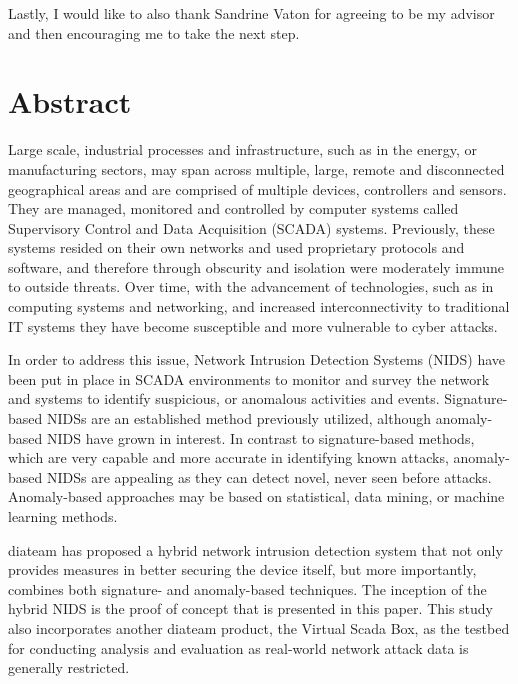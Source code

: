 \documentclass[11pt,]{article}
\begin{document}
Lastly, I would like to also thank Sandrine Vaton for agreeing to be my
advisor and then encouraging me to take the next step.

\newpage
\mbox{} \thispagestyle{empty}

\clearpage

\section*{Abstract}\label{abstract}

Large scale, industrial processes and infrastructure, such as in the
energy, or manufacturing sectors, may span across multiple, large,
remote and disconnected geographical areas and are comprised of multiple
devices, controllers and sensors. They are managed, monitored and
controlled by computer systems called Supervisory Control and Data
Acquisition (SCADA) systems. Previously, these systems resided on their
own networks and used proprietary protocols and software, and therefore
through obscurity and isolation were moderately immune to outside
threats. Over time, with the advancement of technologies, such as in
computing systems and networking, and increased interconnectivity to
traditional IT systems they have become susceptible and more vulnerable
to cyber attacks.

In order to address this issue, Network Intrusion Detection Systems
(NIDS) have been put in place in SCADA environments to monitor and
survey the network and systems to identify suspicious, or anomalous
activities and events. Signature-based NIDSs are an established method
previously utilized, although anomaly-based NIDS have grown in interest.
In contrast to signature-based methods, which are very capable and more
accurate in identifying known attacks, anomaly-based NIDSs are appealing
as they can detect novel, never seen before attacks. Anomaly-based
approaches may be based on statistical, data mining, or machine learning
methods.

diateam has proposed a hybrid network intrusion detection system that
not only provides measures in better securing the device itself, but
more importantly, combines both signature- and anomaly-based techniques.
The inception of the hybrid NIDS is the proof of concept that is
presented in this paper. This study also incorporates another diateam
product, the Virtual Scada Box, as the testbed for conducting analysis
and evaluation as real-world network attack data is generally
restricted.
\end{document}
